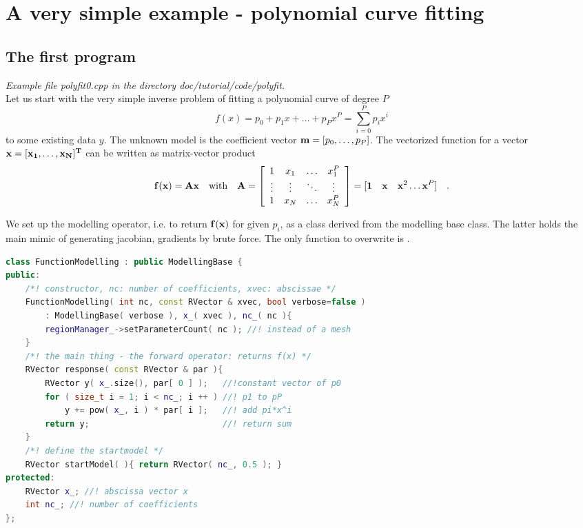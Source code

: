 \section{A very simple example - polynomial curve fitting}\label{sec:simple}
\subsection{The first program}
{\em Example file polyfit0.cpp in the directory doc/tutorial/code/polyfit.}\\
Let us start with the very simple inverse problem of fitting a polynomial curve of degree $P$
\[ f(x) = p_0 +p_1 x + \ldots + p_P x^P= \sum\limits_{i=0}^{P} p_i x^i \]
to some existing data $y$. The unknown model is the coefficient vector $\mathbf{m}=[p_0,\ldots,p_P]$.
The vectorized function for a vector $\bf x=[x_1,\ldots,x_N]^T$ can be written as matrix-vector product
\begin{equation}\label{eq:yAx}
  \mathbf{f}(\mathbf{x}) = \mathbf{A} \mathbf{x} \quad\mbox{with}\quad \mathbf{A}=\left[ \begin{array}{cccc}
  1 & x_1 & \ldots & x_1^P \\ \vdots & \vdots & \ddots & \vdots \\ 1 & x_N & \ldots & x_N^P
  \end{array} \right] = [ {\bf 1}\quad \mathbf{x} \quad \mathbf{x}^2 \ldots \mathbf{x}^P ] \quad.
\end{equation}

We set up the modelling operator, i.e. to return $\mathbf{f}(\mathbf{x})$ for given $p_i$, as a class derived from the modelling base class. The latter holds the main mimic of generating jacobian, gradients by brute force. The only function to overwrite is .

\lstset{language=[ISO]C++}
\lstset{basicstyle=\small,keywordstyle=\bfseries}
\begin{lstlisting}[language=C++,morekeywords={RVector,ModellingBase}]
class FunctionModelling : public ModellingBase {
public:
    /*! constructor, nc: number of coefficients, xvec: abscissae */
    FunctionModelling( int nc, const RVector & xvec, bool verbose=false )
        : ModellingBase( verbose ), x_( xvec ), nc_( nc ){
        regionManager_->setParameterCount( nc ); //! instead of a mesh
    }
    /*! the main thing - the forward operator: returns f(x) */
    RVector response( const RVector & par ){
        RVector y( x_.size(), par[ 0 ] );   //!constant vector of p0
        for ( size_t i = 1; i < nc_; i ++ ) //! p1 to pP
            y += pow( x_, i ) * par[ i ];   //! add pi*x^i
        return y;                           //! return sum
    }
    /*! define the startmodel */
    RVector startModel( ){ return RVector( nc_, 0.5 ); }
protected:
    RVector x_; //! abscissa vector x
    int nc_; //! number of coefficients
};
\end{lstlisting}

